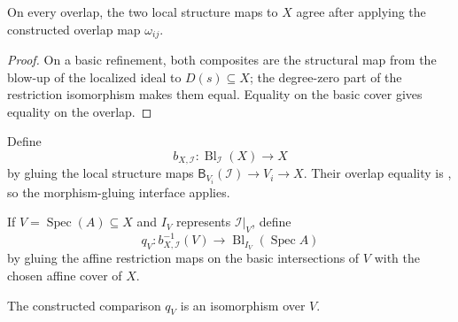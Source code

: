 \begin{lemma}
  \label{lemma:nagata-global-blowup-local-maps-agree}

  On every overlap, the two local structure maps to $X$ agree after applying
  the constructed overlap map $\omega_{ij}$.
\end{lemma}

\begin{proof}
  On a basic refinement, both composites are the structural map from the
  blow-up of the localized ideal to $D(s)\subseteq X$; the degree-zero part of
  the restriction isomorphism makes them equal.  Equality on the basic cover
  gives equality on the overlap.
\end{proof}

\begin{definition}
  \label{def:nagata-global-blowup-map}

  Define
  \[
    b_{X,\mathcal I}\colon\operatorname{Bl}_{\mathcal I}(X)\longrightarrow X
  \]
  by gluing the local structure maps
  $\mathsf B_{V_i}(\mathcal I)\to V_i\to X$.  Their overlap equality is
  , so the morphism-gluing
  interface applies.
\end{definition}

\begin{definition}
  \label{def:nagata-global-blowup-affine-restriction-map}

  If $V=\operatorname{Spec}(A)\subseteq X$ and $I_V$ represents
  $\mathcal I|_V$, define
  \[
    q_V\colon b_{X,\mathcal I}^{-1}(V)\longrightarrow
      \operatorname{Bl}_{I_V}(\operatorname{Spec}A)
  \]
  by gluing the affine restriction maps on the basic intersections of $V$
  with the chosen affine cover of $X$.
\end{definition}

\begin{proposition}
  \label{prop:nagata-global-blowup-affine-restrict}

  The constructed comparison $q_V$ is an isomorphism over $V$.
\end{proposition}

